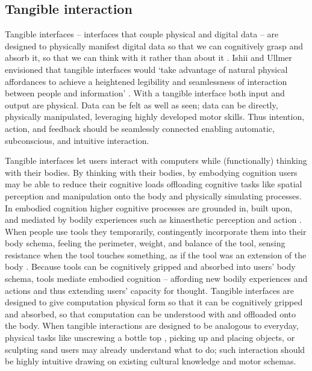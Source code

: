 \subsection{Tangible interaction}

Tangible interfaces -- interfaces that couple physical and digital data \cite{Dourish2001} -- 
are designed to physically manifest digital data so that we can cognitively grasp and absorb it,
so that we can think with it rather than about it \cite{Kirsh2013}. 
%
Ishii and Ullmer envisioned that tangible interfaces would  `take advantage of natural physical affordances to achieve a heightened legibility and seamlessness of interaction between people and information' \cite{Ishii1997}. 
%
With a tangible interface both input and output are physical. 
%
Data can be felt as well as seen; data can be directly, physically manipulated, leveraging highly developed motor skills. 
%
Thus intention, action, and feedback should be seamlessly connected 
enabling automatic, subconscious, and intuitive interaction.

Tangible interfaces let users interact with computers while (functionally) thinking with their bodies. 
%
By thinking with their bodies, by embodying cognition 
users may be able to reduce their cognitive loads
offloading cognitive tasks like 
spatial perception and manipulation 
onto the body and 
physically simulating processes.
%
In embodied cognition higher cognitive processes are grounded in, built upon, and mediated by bodily experiences such as kinaesthetic perception and action \cite{Hardy-Vallee2008}. 
%
When people use tools they temporarily, contingently incorporate them into their body schema, feeling the perimeter, weight, and balance of the tool, 
sensing resistance when the tool touches something, 
as if the tool was an extension of the body \cite{Maravita2004}.
%
Because tools can be cognitively gripped and absorbed into users' body schema, tools mediate embodied cognition -- affording new bodily experiences and actions and thus extending users' capacity for thought. 
%
Tangible interfaces are designed to give computation physical form 
so that it can be cognitively gripped and absorbed, 
so that computation can be understood with and offloaded onto the body.
%
When tangible interactions are designed to be analogous to everyday, physical tasks 
like unscrewing a bottle top \cite{Kirsh2013}, 
picking up and placing objects, 
or sculpting sand 
users may already understand what to do; 
such interaction should be highly intuitive
drawing on existing cultural knowledge and motor schemas. 

